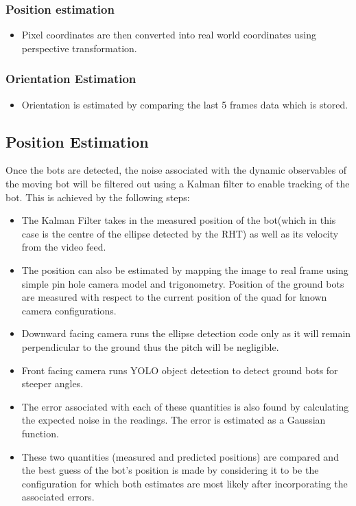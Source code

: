 \documentclass[12pt]{article}
\begin{document}
		\subsubsection{Position estimation}        
			\begin{itemize}            
				\item Pixel coordinates are then converted into real world coordinates using perspective transformation.             
			\end{itemize}     
		\subsubsection{Orientation  Estimation}            
			\begin{itemize}       
				\item Orientation is estimated by comparing the last 5 frames data 		which is stored.                         
			\end{itemize}    
         \subsection{Position Estimation}
        Once the bots are detected, the noise associated with the dynamic observables of the moving bot will be filtered out using a Kalman filter to enable tracking of the bot.  This is achieved by the following steps:
        \begin{itemize}
            \item The Kalman Filter takes in the measured position of the bot(which in this case is the centre of the ellipse detected by the RHT) as well as its velocity from the video feed.
            \item The position can also be estimated by mapping the image to real frame using simple pin hole camera model and trigonometry. Position of the ground bots are measured with respect to the current position of the quad for known camera configurations.
            \item Downward facing camera runs the ellipse detection code only as it will remain perpendicular to the ground thus the pitch will be negligible.
            \item Front facing camera runs YOLO object detection to detect ground bots for steeper angles.
            
            \item The error associated with each of these quantities is also found by calculating the expected noise in the readings. The error is estimated as a Gaussian function. 
            \item These two quantities (measured and predicted positions) are compared and the best guess of the bot’s position is made by considering it to be the configuration for which both estimates are most likely after incorporating the associated errors.
        \end{itemize}
    
\end{document}
